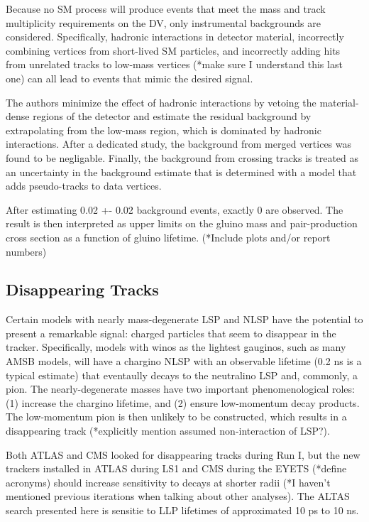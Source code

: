 \documentclass[12pt]{article}
\begin{document}
            Because no SM process will produce events that meet the mass and track multiplicity requirements on the DV, only instrumental backgrounds are considered. Specifically, hadronic interactions in detector material, incorrectly combining vertices from short-lived SM particles, and incorrectly adding hits from unrelated tracks to low-mass vertices (*make sure I understand this last one) can all lead to events that mimic the desired signal.

            The authors minimize the effect of hadronic interactions by vetoing the material-dense regions of the detector and estimate the residual background by extrapolating from the low-mass region, which is dominated by hadronic interactions. After a dedicated study, the background from merged vertices was found to be negligable. Finally, the background from crossing tracks is treated as an uncertainty in the background estimate that is determined with a model that adds pseudo-tracks to data vertices. 

            After estimating 0.02 +- 0.02 background events, exactly 0 are observed. The result is then interpreted as upper limits on the gluino mass and pair-production cross section as a function of gluino lifetime. (*Include plots and/or report numbers)

\subsection{Disappearing Tracks}
            Certain models with nearly mass-degenerate LSP and NLSP have the potential to present a remarkable signal: charged particles that seem to disappear in the tracker. Specifically, models with winos as the lightest gauginos, such as many AMSB models, will have a chargino NLSP with an observable lifetime (0.2 ns is a typical estimate) that eventaully decays to the neutralino LSP and, commonly, a pion. The nearly-degenerate masses have two important phenomenological roles: (1) increase the chargino lifetime, and (2) ensure low-momentum decay products. The low-momentum pion is then unlikely to be constructed, which results in a disappearing track (*explicitly mention assumed non-interaction of LSP?).

            Both ATLAS and CMS looked for disappearing tracks during Run I, but the new trackers installed in ATLAS during LS1 and CMS during the EYETS (*define acronyms) should increase sensitivity to decays at shorter radii (*I haven't mentioned previous iterations when talking about other analyses). The ALTAS search presented here is sensitie to LLP lifetimes of approximated 10 ps to 10 ns.
\end{document}
